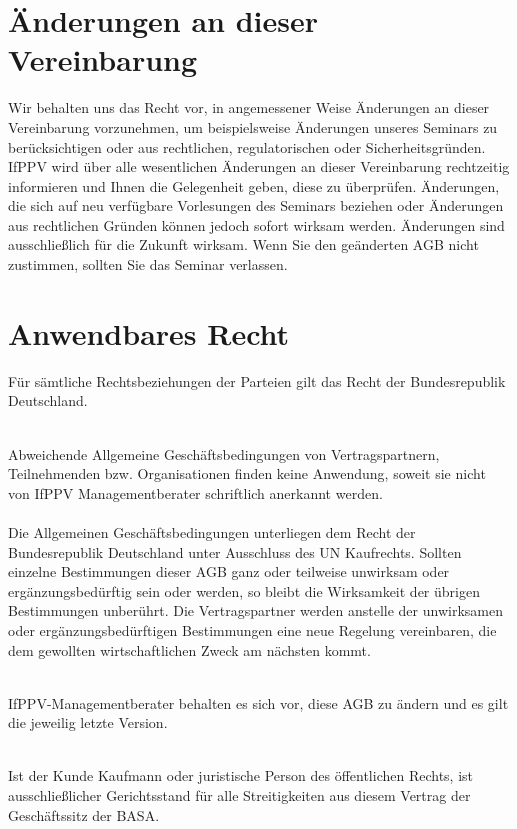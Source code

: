 \documentclass[a4paper, 12pt]{scrartcl}
\begin{document}
    \section{\"Anderungen an dieser Vereinbarung}
    Wir behalten uns das Recht vor, in angemessener Weise \"Anderungen an dieser Vereinbarung vorzunehmen, um beispielsweise \"Anderungen unseres Seminars zu ber\"ucksichtigen oder aus rechtlichen, regulatorischen oder Sicherheitsgr\"unden. IfPPV wird \"uber alle wesentlichen \"Anderungen an dieser Vereinbarung rechtzeitig informieren und Ihnen die Gelegenheit geben, diese zu \"uberpr\"ufen. \"Anderungen, die sich auf neu verf\"ugbare Vorlesungen des Seminars beziehen oder \"Anderungen aus rechtlichen Gr\"unden k\"onnen jedoch sofort wirksam werden. \"Anderungen sind ausschließlich f\"ur die Zukunft wirksam. Wenn Sie den ge\"anderten AGB nicht zustimmen, sollten Sie das Seminar verlassen.
    \section{Anwendbares Recht}
    F\"ur s\"amtliche Rechtsbeziehungen der Parteien gilt das Recht der Bundesrepublik Deutschland. \\ \\ \noindent

Abweichende Allgemeine Gesch\"aftsbedingungen von Vertragspartnern, Teilnehmenden bzw. Organisationen finden keine Anwendung, soweit sie nicht von IfPPV Managementberater schriftlich anerkannt werden. \\ \\ \noindent
Die Allgemeinen Gesch\"aftsbedingungen unterliegen dem Recht der Bundesrepublik Deutschland unter Ausschluss des UN Kaufrechts.
Sollten einzelne Bestimmungen dieser AGB ganz oder teilweise unwirksam oder erg\"anzungsbed\"urftig sein oder werden, so bleibt die Wirksamkeit der \"ubrigen Bestimmungen unber\"uhrt. Die Vertragspartner werden anstelle der unwirksamen oder erg\"anzungsbed\"urftigen Bestimmungen eine neue Regelung vereinbaren, die dem gewollten wirtschaftlichen Zweck am n\"achsten kommt. \\ \\ \noindent

IfPPV-Managementberater behalten es sich vor, diese AGB zu \"andern und es gilt die jeweilig letzte Version. \\ \\ \noindent

Ist der Kunde Kaufmann oder juristische Person des \"offentlichen Rechts, ist ausschließlicher Gerichtsstand f\"ur alle Streitigkeiten aus diesem Vertrag der Gesch\"aftssitz der BASA.
    \newpage
\end{document}
